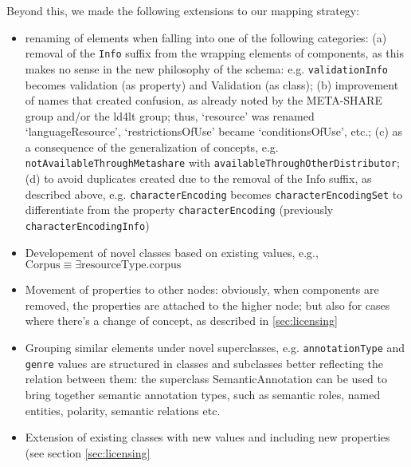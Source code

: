 \documentclass{llncs}
\begin{document}
{Beyond this, we made the following extensions to our mapping strategy:
\begin{itemize}
\item renaming of elements when falling into one of the following categories:
(a) removal of the {\tt Info} suffix from the wrapping elements of components, as this makes no sense in the new philosophy of the schema: e.g. {\tt validationInfo} becomes validation (as property) and Validation (as class);
(b) improvement of names that created confusion, as already noted by the META-SHARE group and/or the ld4lt group; thus, `resource' was renamed
`languageResource', `restrictionsOfUse' became `conditionsOfUse', etc.;
(c) as a consequence of the generalization of concepts, e.g. {\tt notAvailableThroughMetashare} with {\tt availableThroughOtherDistributor};
(d) to avoid duplicates created due to the removal of the Info suffix, as described above, e.g. {\tt characterEncoding} becomes {\tt characterEncodingSet} to differentiate from the property {\tt characterEncoding} (previously {\tt characterEncodingInfo})
\item Developement of novel classes based on existing values, e.g., $\mathrm{Corpus} \equiv \exists \mathrm{resourceType}.\mathrm{corpus}$
\item Movement of properties to other nodes: obviously, when components are removed, the properties are attached to the higher node; but also for cases where there's a change of concept, as described in \ref{sec:licensing} 
\item Grouping similar elements under novel superclasses, e.g. {\tt annotationType} and {\tt genre} values are structured in classes and subclasses better reflecting the relation between them: the superclass SemanticAnnotation can be used to bring together semantic annotation types, such as semantic roles, named entities, polarity, semantic relations etc.
\item Extension of existing classes with new values and including new properties (see section \ref{sec:licensing}
\end{itemize}
}
\end{document}
